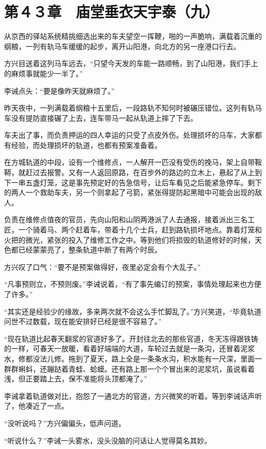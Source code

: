 \section{第４３章　庙堂垂衣天宇泰（九）}

从京西的驿站系统精挑细选出来的车夫望空一挥鞭，啪的一声脆响，满载着沉重的纲粮，一列有轨马车缓缓的起步，离开山阳港，向北方的另一座港口行去。

方兴目送着这列马车远去，“只望今天发的车能一路顺畅，到了山阳港，我们手上的麻烦事就能少一半了。”

李诫点头：“要是像昨天就麻烦了。”

昨天夜中，一列满载着纲粮十五里后，一段路轨不知何时被碾压错位。这列有轨马车没有提防直接碾了上去，连车带马一起从轨道上摔了下去。

车夫出了事，而负责押运的四人幸运的只受了点皮外伤。处理损坏的马车，大家都有经验，而处理损坏的轨道，也都有预案准备着。

在方城轨道的中段，设有一个维修点，一人解开一匹没有受伤的挽马，架上自带鞍鞯，就赶过去报警。又有一人返回原路，在百步外的路边的立木上，悬起了从上到下一串五盏灯笼，这是事先预定好的告急信号，让后车看见之后能紧急停车。剩下的两人一个救助车夫，另一个则拿起了弓箭，紧张得提防起黑暗中可能会出现的敌人。

负责在维修点值夜的官员，先向山阳和山阴两港派了人去通报，接着派出三名工匠，一个骑着马、两个赶着车，带着十几个士兵，赶到路轨损坏地点。靠着灯笼和火把的微光，紧张的投入了维修工作之中。等到他们将损毁的轨道修好的时候，天色都已经蒙蒙亮了，整条轨道中断了有两个时辰。

方兴叹了口气：“要不是预案做得好，夜里必定会有个大乱子。”

“凡事预则立，不预则废。”李诫说着，“有了事先编订的预案，事情处理起来也方便了许多。”

“其实还是经验少的缘故，多来两次就不会这么手忙脚乱了。”方兴笑道，“毕竟轨道问世不过数载，现在能安排好已经是很不容易了。”

“现在轨道比起春天翻浆的官道好多了。开封往北去的那些官道，冬天冻得跟铁铸的一样，可春天一放暖，看着好端端的大道，车轮过去就是一条沟，还冒着泥浆水，修都没法儿修。拖到了夏天，路上全是一条条水沟，积水能有一尺深，里面一群群蝌蚪，还蹦跶着青蛙、蛤蟆。还有路上那一个个冒出来的泥浆坑，虽说看着浅，但正要踏上去，保不准能将头顶都淹了。”

李诫拿着轨道做对比，抱怨了一通北方的官道，方兴微笑的听着。等到李诫话声听了，他凑近了一点。

“没听说吗？”方兴偏偏头，低声问道。

“听说什么？”李诫一头雾水，没头没脑的问话让人觉得莫名其妙。

